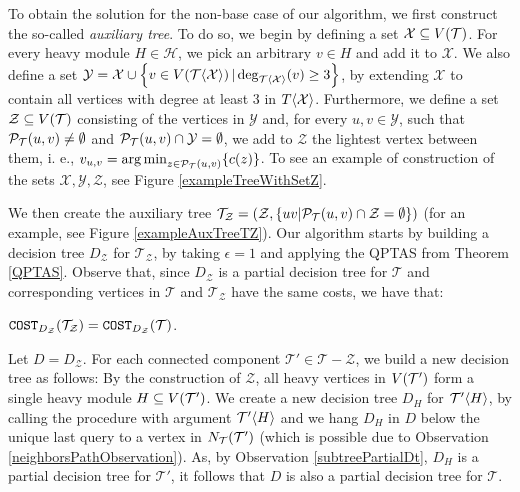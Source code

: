 To obtain the solution for the non-base case of our algorithm, we first construct the so-called \textit{auxiliary tree}. To do so, we begin by defining a set $\mathcal{X}\subseteq V\mathopen{}\left( \mathcal{T} \right)$. For every heavy module $H\in\mathcal{H}$, we pick an arbitrary $v\in H$ and add it to $\mathcal{X}$. We also define a set 
$\mathcal{Y}=\mathcal{X}\cup\mathopen{}\left\{ v\in V\mathopen{}\left( \mathcal{T}\mathopen{}\langle \mathcal{X} \rangle \right) | \deg_{\mathcal{T}\mathopen{}\langle \mathcal{X} \rangle}\mathopen{}\left( v \right)\geq 3 \right\}$, by extending $\mathcal{X}$ to contain all vertices with degree at least $3$ in $T\mathopen{}\langle \mathcal{X} \rangle$. Furthermore, we define a set $\mathcal{Z}\subseteq V\mathopen{}\left( \mathcal{T} \right)$ consisting of the vertices in $\mathcal{Y}$ and, for every $u,v\in \mathcal{Y}$, such that $\mathcal{P}_{\mathcal{T}}\mathopen{}\left( u, v \right)\neq\emptyset$ and $\mathcal{P}_{\mathcal{T}}\mathopen{}\left( u, v \right)\cap \mathcal{Y}=\emptyset$, we add to $\mathcal{Z}$ the lightest vertex between them, i. e., 
$v_{u,v} = \operatorname*{arg\,min}_{z\in \mathcal{P}_{\mathcal{T}}\mathopen{}\left( u, v \right)}\mathopen{}\left\{ c\mathopen{}\left( z \right) \right\}$.
To see an example of construction of the sets $\mathcal{X}, \mathcal{Y}, \mathcal{Z}$, see Figure \ref{exampleTreeWithSetZ}. 

We then create the auxiliary tree 
$\mathcal{T}_{\mathcal{Z}}=\mathopen{}\left( \mathcal{Z},\mathopen{}\left\{ uv | \mathcal{P}_{\mathcal{T}}\mathopen{}\left( u, v \right)\cap \mathcal{Z}=\emptyset \right\} \right)$ 
(for an example, see Figure \ref{exampleAuxTreeTZ}). Our algorithm starts by building a decision tree $D_{\mathcal{Z}}$ for $\mathcal{T}_{\mathcal{Z}}$, by taking $\epsilon=1$ and applying the QPTAS from Theorem \ref{QPTAS}. Observe that, since $D_{\mathcal{Z}}$ is a partial decision tree for $\mathcal{T}$ and corresponding vertices in $\mathcal{T}$ and $\mathcal{T}_{\mathcal{Z}}$ have the same costs, we have that:


\begin{observation}\label{CostDZinTObservation}
    $\texttt{COST}_{D_{\mathcal{Z}}}\mathopen{}\left( \mathcal{T}_{\mathcal{Z}} \right)=\texttt{COST}_{D_{\mathcal{Z}}}\mathopen{}\left( \mathcal{T} \right)$.
\end{observation}


Let $D = D_{\mathcal{Z}}$. For each connected component $\mathcal{T}'\in \mathcal{T}-\mathcal{Z}$, we build a new decision tree as follows: By the construction of $\mathcal{Z}$, all heavy vertices in $V\mathopen{}\left( \mathcal{T}' \right)$ form a single heavy module $H\subseteq V\mathopen{}\left( \mathcal{T}' \right)$. We create a new decision tree $D_H$ for $\mathcal{T}'\mathopen{}\langle H \rangle$, by calling the \FRankingBasedDT procedure with argument $\mathcal{T}'\mathopen{}\langle H \rangle$ and we hang $D_{H}$ in $D$ below the unique last query to a vertex in $N_\mathcal{T}\mathopen{}\left( \mathcal{T}' \right)$ (which is possible due to Observation \ref{neighborsPathObservation}). As, by Observation \ref{subtreePartialDt}, $D_H$ is a partial decision tree for $\mathcal{T}'$, it follows that $D$ is also a partial decision tree for $\mathcal{T}$. 

